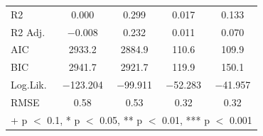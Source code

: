 \documentclass[
]{article}
\begin{document}
\begin{table}
\begin{tabular}[t]{lcccc}
R2 & \num{0.000} & \num{0.299} & \num{0.017} & \num{0.133}\\
R2 Adj. & \num{-0.008} & \num{0.232} & \num{0.011} & \num{0.070}\\
AIC & \num{2933.2} & \num{2884.9} & \num{110.6} & \num{109.9}\\
BIC & \num{2941.7} & \num{2921.7} & \num{119.9} & \num{150.1}\\
Log.Lik. & \num{-123.204} & \num{-99.911} & \num{-52.283} & \num{-41.957}\\
RMSE & \num{0.58} & \num{0.53} & \num{0.32} & \num{0.32}\\
\bottomrule
\multicolumn{5}{l}{\rule{0pt}{1em}+ p $<$ 0.1, * p $<$ 0.05, ** p $<$ 0.01, *** p $<$ 0.001}\\
\end{tabular}
\end{table}
\end{document}

